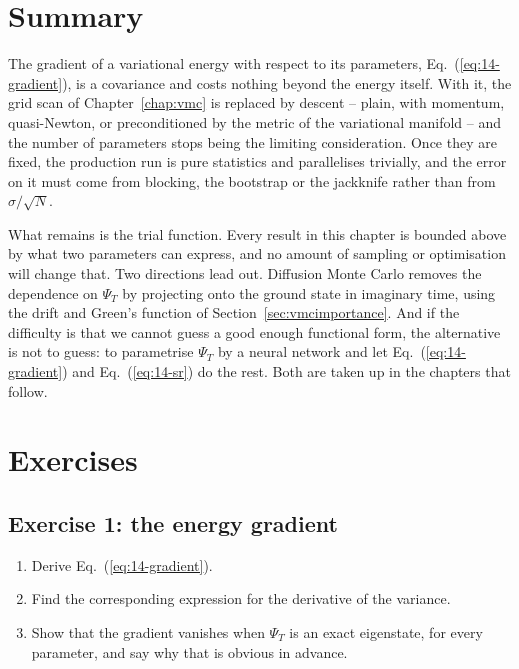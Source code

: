 \section{Summary}
\label{sec:optsummary}

The gradient of a variational energy with respect to its parameters,
Eq.~(\ref{eq:14-gradient}), is a covariance and costs nothing beyond the
energy itself.  With it, the grid scan of Chapter~\ref{chap:vmc} is replaced
by descent -- plain, with momentum, quasi-Newton, or preconditioned by the
metric of the variational manifold -- and the number of parameters stops being
the limiting consideration.  Once they are fixed, the production run is pure
statistics and parallelises trivially, and the error on it must come from
blocking, the bootstrap or the jackknife rather than from $\sigma/\sqrt{N}$.

What remains is the trial function.  Every result in this chapter is bounded
above by what two parameters can express, and no amount of sampling or
optimisation will change that.  Two directions lead out.  Diffusion Monte
Carlo removes the dependence on $\Psi_T$ by projecting onto the ground state
in imaginary time, using the drift and Green's function of
Section~\ref{sec:vmcimportance}.  And if the difficulty is that we cannot
guess a good enough functional form, the alternative is not to guess: to
parametrise $\Psi_T$ by a neural network and let Eq.~(\ref{eq:14-gradient})
and Eq.~(\ref{eq:14-sr}) do the rest.  Both are taken up in the chapters that
follow.

\section{Exercises}

\subsection*{Exercise 1: the energy gradient}
\label{ex:14-gradient}

\begin{enumerate}
  \item[a)] Derive Eq.~(\ref{eq:14-gradient}).
  \item[b)] Find the corresponding expression for the derivative of the
  variance.
  \item[c)] Show that the gradient vanishes when $\Psi_T$ is an exact
  eigenstate, for every parameter, and say why that is obvious in advance.
\end{enumerate}

